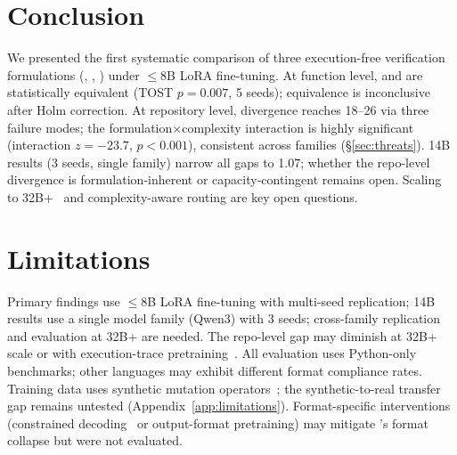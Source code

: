 \section{Conclusion}
\label{sec:conclusion}

We presented the first systematic comparison of three execution-free verification formulations (\cls{}, \cwm{}, \traj{}) under ${\leq}$8B LoRA fine-tuning. At function level, \cls{} and \cwm{} are statistically equivalent (TOST $p{=}0.007$, 5 seeds); \traj{} equivalence is inconclusive after Holm correction. At repository level, divergence reaches 18--26\pp{} via three failure modes; the formulation$\times$complexity interaction is highly significant (interaction $z{=}-23.7$, $p{<}0.001$), consistent across families (\S\ref{sec:threats}). 14B results (3 seeds, single family) narrow all gaps to 1.07\pp{}; whether the repo-level divergence is formulation-inherent or capacity-contingent remains open. Scaling to 32B+~\cite{meta2025cwm} and complexity-aware routing are key open questions.

\section*{Limitations}

Primary findings use ${\leq}$8B LoRA fine-tuning with multi-seed replication; 14B results use a single model family (Qwen3) with 3 seeds; cross-family replication and evaluation at 32B+ are needed. The repo-level gap may diminish at 32B+ scale or with execution-trace pretraining~\cite{meta2025cwm}. All evaluation uses Python-only benchmarks; other languages may exhibit different format compliance rates. Training data uses synthetic mutation operators~\cite{andrews2005mutation,just2014mutants}; the synthetic-to-real transfer gap remains untested (Appendix~\ref{app:limitations}). Format-specific interventions (constrained decoding~\cite{poesia2022synchromesh,dong2024xgrammar,willard2023outlines} or output-format pretraining) may mitigate \cwm{}'s format collapse but were not evaluated.
